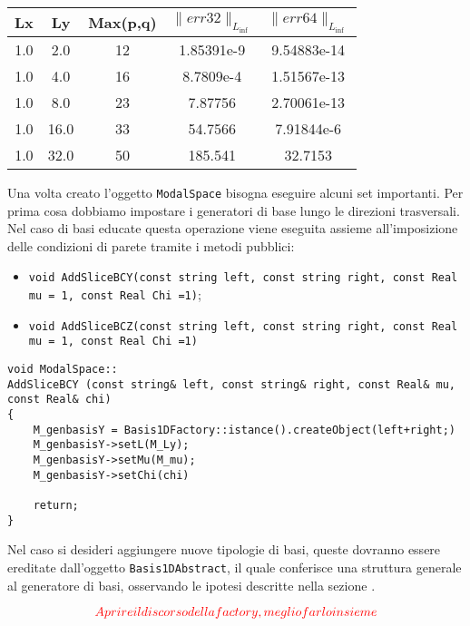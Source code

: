 \begin{center}
\begin{tabular}{|c|c|c|c|c|}
\hline
Lx&Ly & Max(p,q) &  $\parallel err32 \parallel_{L_{\inf}}$ &  $\parallel err64 \parallel_{L_{\inf}}$ \\
\hline
1.0&2.0 & 12 & 1.85391e-9 & 9.54883e-14 \\
\hline
1.0&4.0 & 16 & 8.7809e-4 & 1.51567e-13 \\
\hline
1.0&8.0 & 23 & 7.87756 & 2.70061e-13 \\
\hline
1.0&16.0 & 33 & 54.7566 & 7.91844e-6 \\
\hline
1.0&32.0 & 50 & 185.541 & 32.7153 \\
\hline
\end{tabular}
\end{center}


Una volta creato l'oggetto \texttt{ModalSpace} bisogna eseguire alcuni set importanti. Per prima cosa dobbiamo impostare i generatori di base lungo le direzioni trasversali. Nel caso di basi educate questa operazione viene eseguita assieme all'imposizione delle condizioni di parete tramite i metodi pubblici:
\begin{itemize}
\item \texttt{void AddSliceBCY(const string left, const string right, const Real mu = 1, const Real Chi =1)};
\item \texttt{void AddSliceBCZ(const string left, const string right, const Real mu = 1, const Real Chi =1)}
\end{itemize}

\begin{lstlisting}[style = general]
void ModalSpace::
AddSliceBCY (const string& left, const string& right, const Real& mu, const Real& chi)
{
	M_genbasisY = Basis1DFactory::istance().createObject(left+right;)
	M_genbasisY->setL(M_Ly);
	M_genbasisY->setMu(M_mu);
	M_genbasisY->setChi(chi)
	
	return;
}
\end{lstlisting}
 Nel caso si desideri aggiungere nuove tipologie di basi, queste dovranno essere ereditate dall'oggetto \texttt{Basis1DAbstract}, il quale conferisce una struttura generale al generatore di basi, osservando le ipotesi descritte nella sezione .
 
 \begin{equation}
\textcolor{red}{Aprire il discorso della factory, meglio farlo insieme} 
 \end{equation}

